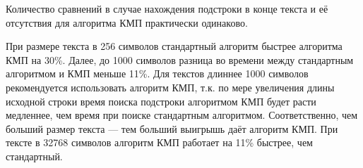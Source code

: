 Количество сравнений в случае нахождения подстроки в конце текста и её отсутствия для алгоритма КМП практически одинаково.

При размере текста в 256 символов стандартный алгоритм быстрее алгоритма КМП на 30\%.
Далее, до 1000 символов разница во времени между стандартным алгоритмом и КМП меньше 11\%.
Для текстов длиннее 1000 символов рекомендуется использовать алгоритм КМП, т.к. по мере увеличения длины исходной строки время поиска подстроки алгоритмом КМП будет расти медленнее, чем время при поиске стандартным алгоритмом.
Соответственно, чем больший размер текста --- тем больший выигрышь даёт алгоритм КМП.
При тексте в 32768 символов алгоритм КМП работает на 11\% быстрее, чем стандартный.

